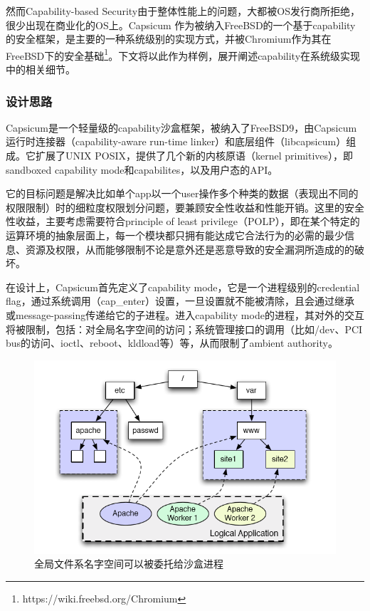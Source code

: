 \documentclass[final,12pt]{elsarticle}
\begin{document}
然而Capability-based Security由于整体性能上的问题，大都被OS发行商所拒绝，很少出现在商业化的OS上。Capsicum \cite{capsicum} 作为被纳入FreeBSD的一个基于capability的安全框架，是主要的一种系统级别的实现方式，并被Chromium作为其在FreeBSD下的安全基础\footnote{https://wiki.freebsd.org/Chromium}。下文将以此作为样例，展开阐述capability在系统级实现中的相关细节。

\subsubsection{设计思路}
\label{sss:design}

Capsicum是一个轻量级的capability沙盒框架，被纳入了FreeBSD9，由Capsicum运行时连接器（capability-aware run-time linker）和底层组件（libcapsicum）组成。它扩展了UNIX POSIX，提供了几个新的内核原语（kernel primitives），即sandboxed capability mode和capabilites，以及用户态的API。

它的目标问题是解决比如单个app以一个user操作多个种类的数据（表现出不同的权限限制）时的细粒度权限划分问题，要兼顾安全性收益和性能开销。这里的安全性收益，主要考虑需要符合principle of least privilege（POLP），即在某个特定的运算环境的抽象层面上，每一个模块都只拥有能达成它合法行为的必需的最少信息、资源及权限，从而能够限制不论是意外还是恶意导致的安全漏洞所造成的的破坏。

在设计上，Capsicum首先定义了capability mode，它是一个进程级别的credential flag，通过系统调用（cap\_enter）设置，一旦设置就不能被清除，且会通过继承或message-passing传递给它的子进程。进入capability mode的进程，其对外的交互将被限制，包括：对全局名字空间的访问；系统管理接口的调用（比如/dev、PCI bus的访问、ioctl、reboot、kldload等）等，从而限制了ambient authority。

\begin{figure}
\centering
\includegraphics[width=0.65\linewidth]{imgs/fs-namespace-subsets.png}
\caption{全局文件系名字空间可以被委托给沙盒进程}
\label{fig:fd-namespace-subsets}
\end{figure}
\end{document}
